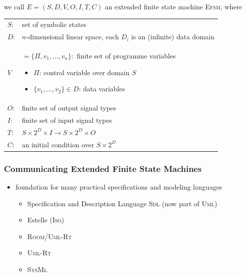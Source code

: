 \documentclass[a4paper, 10pt]{article}
\begin{document}
\begin{shaded}
    we call $E=(S,D,V,O,I,T,C)$ an extended finite state machine \textsc{Efsm}, where \\
    \begin{tabular}{ll}
    $S$: & set of symbolic states \\
    $D$: & $n$-dimensional linear space, each $D_i$ is an (infinite) data domain \\
    $V$ &
    \begin{minipage}[t]{10cm}
    $=\{\Pi,v_1,\dots,v_n\}:$ finite set of programme variables
    \begin{itemize}
        \item $\Pi$: control variable over domain $S$
        \item $\{v_1,\dots,v_2\}\in D$: data variables
    \end{itemize}
    \end{minipage} \\
    $O$: & finite set of output signal types \\
    $I$: & finite set of input signal types \\
    $T$: & $S\times 2^D\times I \to S\times 2^D\times O$ \\
    $C$: & an initial condition over $S\times 2^D$
    \end{tabular}
\end{shaded}

\subsubsection*{Communicating Extended Finite State Machines}
\begin{itemize}
    \item foundation for many practical specifications and modeling languages
    \begin{itemize}
        \item Specification and Description Language \textsc{Sdl} (now part of \textsc{Uml})
        \item Estelle (\textsc{Iso})
        \item \textsc{Room/Uml-Rt}
        \item \textsc{Uml-Rt}
        \item \textsc{SysMl}
    \end{itemize}
\end{itemize}
\end{document}
